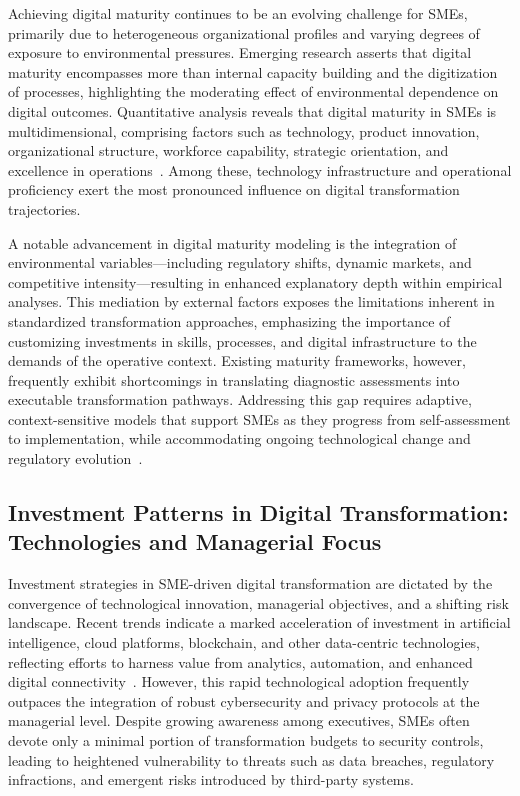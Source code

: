 \documentclass[11pt]{article}
\begin{document}
Achieving digital maturity continues to be an evolving challenge for SMEs, primarily due to heterogeneous organizational profiles and varying degrees of exposure to environmental pressures. Emerging research asserts that digital maturity encompasses more than internal capacity building and the digitization of processes, highlighting the moderating effect of environmental dependence on digital outcomes. Quantitative analysis reveals that digital maturity in SMEs is multidimensional, comprising factors such as technology, product innovation, organizational structure, workforce capability, strategic orientation, and excellence in operations~\cite{ref34}. Among these, technology infrastructure and operational proficiency exert the most pronounced influence on digital transformation trajectories.

A notable advancement in digital maturity modeling is the integration of environmental variables—including regulatory shifts, dynamic markets, and competitive intensity—resulting in enhanced explanatory depth within empirical analyses. This mediation by external factors exposes the limitations inherent in standardized transformation approaches, emphasizing the importance of customizing investments in skills, processes, and digital infrastructure to the demands of the operative context. Existing maturity frameworks, however, frequently exhibit shortcomings in translating diagnostic assessments into executable transformation pathways. Addressing this gap requires adaptive, context-sensitive models that support SMEs as they progress from self-assessment to implementation, while accommodating ongoing technological change and regulatory evolution~\cite{ref34}.

\subsection{Investment Patterns in Digital Transformation: Technologies and Managerial Focus}

Investment strategies in SME-driven digital transformation are dictated by the convergence of technological innovation, managerial objectives, and a shifting risk landscape. Recent trends indicate a marked acceleration of investment in artificial intelligence, cloud platforms, blockchain, and other data-centric technologies, reflecting efforts to harness value from analytics, automation, and enhanced digital connectivity~\cite{ref35}. However, this rapid technological adoption frequently outpaces the integration of robust cybersecurity and privacy protocols at the managerial level. Despite growing awareness among executives, SMEs often devote only a minimal portion of transformation budgets to security controls, leading to heightened vulnerability to threats such as data breaches, regulatory infractions, and emergent risks introduced by third-party systems.
\end{document}
